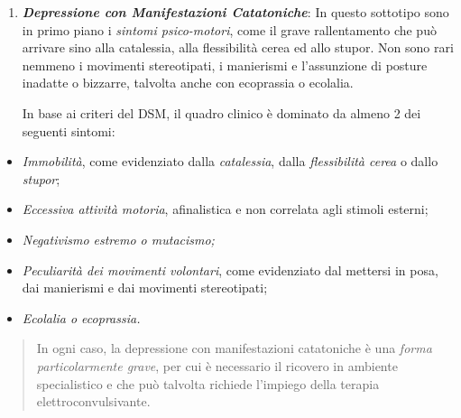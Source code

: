 \documentclass[]{article}
\begin{document}
\begin{enumerate}
\def\labelenumi{\arabic{enumi}.}
\item
  \textbf{\emph{Depressione con Manifestazioni Catatoniche}}: In questo
  sottotipo sono in primo piano i \emph{sintomi psico-motori}, come il
  grave rallentamento che può arrivare sino alla catalessia, alla
  flessibilità cerea ed allo stupor. Non sono rari nemmeno i movimenti
  stereotipati, i manierismi e l'assunzione di posture inadatte o
  bizzarre, talvolta anche con ecoprassia o ecolalia.

  In base ai criteri del DSM, il quadro clinico è dominato da almeno 2
  dei seguenti sintomi:
\end{enumerate}

\begin{itemize}
\item
  \emph{Immobilità}, come evidenziato dalla \emph{catalessia}, dalla
  \emph{flessibilità cerea} o dallo \emph{stupor};
\item
  \emph{Eccessiva attività motoria}, afinalistica e non correlata agli
  stimoli esterni;
\item
  \emph{Negativismo estremo o mutacismo;}
\item
  \emph{Peculiarità dei movimenti volontari}, come evidenziato dal
  mettersi in posa, dai manierismi e dai movimenti stereotipati;
\item
  \emph{Ecolalia o ecoprassia.}
\end{itemize}

\begin{quote}
In ogni caso, la depressione con manifestazioni catatoniche è una
\emph{forma particolarmente grave}, per cui è necessario il ricovero in
ambiente specialistico e che può talvolta richiede l'impiego della
terapia elettroconvulsivante.
\end{quote}
\end{document}

